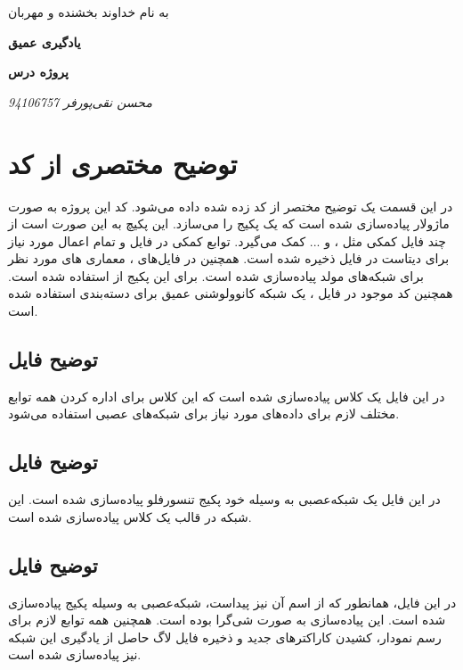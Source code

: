 \documentclass{article}
\begin{document}
\begin{titlepage}
	\centering
	{\scshape\LARGE به نام خداوند بخشنده و مهربان \par}
	\vspace{2cm}
	{\huge\bfseries یادگیری عمیق\par}
	\vspace{3cm}
	{\Large\bfseries  پروژه درس \par}
	\vspace{3cm}
	{\Large\itshape 		محسن نقی‌پورفر		94106757\par}
	\vspace{0.25cm}
	\vfill
\end{titlepage}

\section{توضیح مختصری از کد}
در این قسمت یک توضیح مختصر از کد زده شده داده می‌شود. کد این پروژه به صورت ماژولار پیاده‌سازی شده است که یک پکیج را می‌سازد. این پکیچ به این صورت است از چند فایل کمکی مثل ،  و ... کمک می‌گیرد. توابع کمکی در فایل  و تمام اعمال مورد نیاز برای دیتاست در فایل  ذخیره شده است. همچنین در فایل‌‌های ،  معماری های مورد نظر برای شبکه‌های مولد پیاده‌سازی شده  است. برای این پکیج از  استفاده شده است. همچنین کد موجود در فایل ، یک شبکه کانوولوشنی عمیق برای دسته‌بندی استفاده شده است.
\subsection{توضیح فایل }
در این فایل یک کلاس   پیاده‌سازی شده است که این کلاس برای اداره کردن همه توابع مختلف لازم برای داده‌های مورد نیاز برای شبکه‌های عصبی استفاده می‌شود.
\subsection{توضیح فایل }
در این فایل یک شبکه‌عصبی   به وسیله خود پکیج تنسورفلو پیاده‌سازی شده است. این شبکه در قالب یک کلاس پیاده‌سازی شده است.
\subsection{توضیح فایل }
در این فایل، همانطور که از اسم آن نیز پیداست،‌ شبکه‌عصبی  به وسیله پکیج  پیاده‌سازی شده است. این پیاده‌سازی به صورت شی‌گرا بوده است. همچنین همه توابع لازم برای رسم نمودار‌، کشیدن کاراکتر‌های جدید و ذخیره فایل لاگ حاصل از یادگیری این شبکه‌ نیز پیاده‌سازی شده است.
\end{document}
